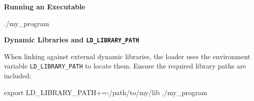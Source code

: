 \textbf{Running an Executable}

\begin{codeblock}[language=bash, numbers=none]
./my_program
\end{codeblock}

\textbf{Dynamic Libraries and \texttt{LD\_LIBRARY\_PATH}}

When linking against external dynamic libraries, the loader uses the environment variable \texttt{LD\_LIBRARY\_PATH} to locate them. Ensure the required library paths are included:

\begin{codeblock}[language=bash, numbers=none]
export LD_LIBRARY_PATH+=:/path/to/my/lib
./my_program
\end{codeblock}
